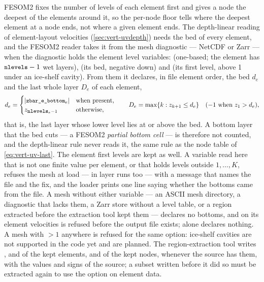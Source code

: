 FESOM2 fixes the number of levels of each element first and gives a node the deepest of the elements
around it, so the per-node floor  tells where the deepest element at a node ends,
not where a given element ends. The depth-linear reading of element-layout velocities
(\cref{sec:vert-uvdepth}) needs the bed of every element, and the FESOM2 reader takes it from the mesh
diagnostic --- NetCDF or Zarr --- when the diagnostic holds the element level variables: 
(one-based; the element has $\texttt{\small nlevels}-1$ wet layers),  (its bed, negative
down) and  (its first level, above 1 under an ice-shelf cavity). From them it declares, in
file element order, the bed $d_e$ and the last whole layer $D_e$ of each element,
\begin{equation}\label{eq:mesh-elem-bed}
  d_e = \begin{cases} |\texttt{\small zbar\_e\_bottom}_e| & \text{when present},\\
                      z_{\texttt{\small nlevels}_e-1} & \text{otherwise},\end{cases}
  \qquad
  D_e = \max\{k : z_{k+1}\le d_e\}\quad(-1 \text{ when } z_1>d_e),
\end{equation}
that is, the last layer whose lower level lies at or above the bed. A bottom layer that the bed cuts ---
a FESOM2 \emph{partial bottom cell} --- is therefore not counted, and the depth-linear rule never reads it,
the same rule as the node table of \cref{eq:vert-uv-last}. The element first levels are kept as well.
A variable read here that is not one finite value per element, or that holds levels outside $1,\dots,K$,
refuses the mesh at load --- in layer runs too --- with a message that names the file and the fix, and
the loader prints one line saying whether the bottoms came from the file. A mesh without either
variable --- an ASCII mesh directory, a diagnostic that lacks them, a Zarr store without a level table, or
a region extracted before the extraction tool kept them --- declares no bottoms, and
 on its element velocities is refused before the output file exists;
 alone declares nothing. A mesh with ${}>1$ anywhere is refused for the
same option: ice-shelf cavities are not supported in the code yet and are planned. The region-extraction
tool  writes ,  and
 of the kept elements, and  of the kept nodes, whenever the
source has them, with the values and signs of the source; a subset written before it did so must be
extracted again to use the option on element data.

